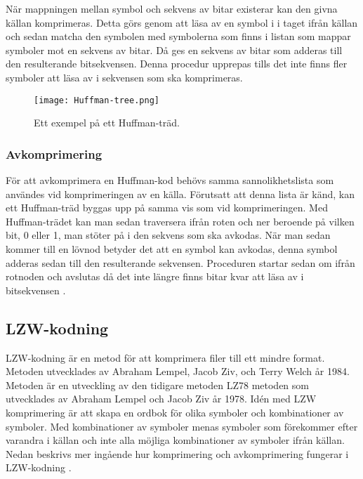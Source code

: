 När mappningen mellan symbol och sekvens av bitar existerar kan den givna källan komprimeras. Detta görs genom att läsa av en symbol i i taget ifrån källan och sedan matcha den symbolen med symbolerna som finns i listan som mappar symboler mot en sekvens av bitar. Då ges en sekvens av bitar som adderas till den resulterande bitsekvensen. Denna procedur upprepas tills det inte finns fler symboler att läsa av i sekvensen som ska komprimeras.  
	
\begin{figure}
  \texttt{[image: Huffman-tree.png]}
  \caption{Ett exempel på ett Huffman-träd.}
  \label{fig:huffman-tree}
\end{figure}


	\subsubsection{Avkomprimering}
	För att avkomprimera en Huffman-kod behövs samma sannolikhetslista som användes vid komprimeringen av en källa. Förutsatt att denna lista är känd, kan ett Huffman-träd byggas upp på samma vis som vid komprimeringen. Med Huffman-trädet kan man sedan traversera ifrån roten och ner beroende på vilken bit, 0 eller 1, man stöter på i den sekvens som ska avkodas. När man sedan kommer till en lövnod betyder det att en symbol kan avkodas, denna symbol adderas sedan till den resulterande sekvensen. Proceduren startar sedan om ifrån rotnoden och avslutas då det inte längre finns bitar kvar att läsa av i bitsekvensen \cite{huffmancoding2018}.
	
\subsection{LZW-kodning}
LZW-kodning är en metod för att komprimera filer till ett mindre format. Metoden utvecklades av Abraham Lempel, Jacob Ziv, och Terry Welch år 1984. Metoden är en utveckling av den tidigare metoden LZ78 metoden som utvecklades av Abraham Lempel och Jacob Ziv år 1978. Idén med LZW komprimering är att skapa en ordbok för olika symboler och kombinationer av symboler. Med kombinationer av symboler menas symboler som förekommer efter varandra i källan och inte alla möjliga kombinationer av symboler ifrån källan. Nedan beskrivs mer ingående hur komprimering och avkomprimering fungerar i LZW-kodning \cite{lempelzivwelch2018}.
